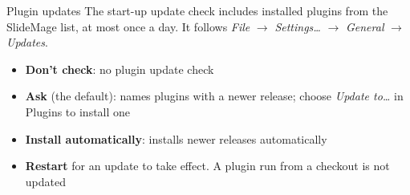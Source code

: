 
\begin{standardframe}{Plugin updates}
	\small
	The start-up update check includes installed plugins from the SlideMage
	list, at most once a day. It follows \emph{File} $\rightarrow$
	\emph{Settings\ldots} $\rightarrow$ \emph{General} $\rightarrow$ \emph{Updates}.
	\par\medskip
	\begin{itemize}
		\item \textbf{Don't check}: no plugin update check
		\item \textbf{Ask} (the default): names plugins with a newer release; choose \emph{Update to\ldots} in Plugins to install one
		\item \textbf{Install automatically}: installs newer releases automatically
		\item \textbf{Restart} for an update to take effect. A plugin run from a checkout is not updated
	\end{itemize}
\end{standardframe}
